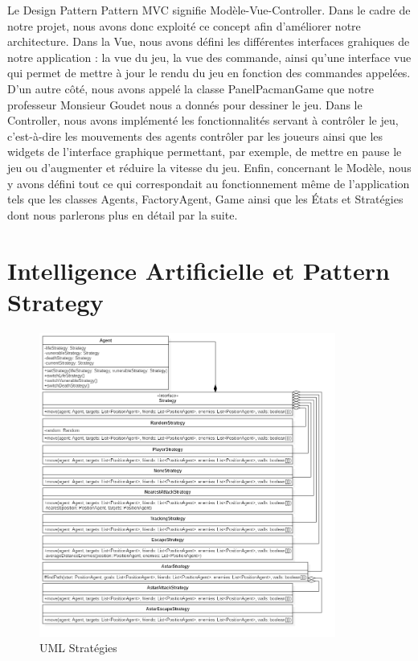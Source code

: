 \documentclass[a4paper, 11pt]{article}
\begin{document}
Le Design Pattern Pattern MVC signifie Modèle-Vue-Controller. Dans le cadre de notre projet, nous avons donc exploité ce concept afin d'améliorer
notre architecture. Dans la Vue, nous avons défini les différentes interfaces grahiques de notre application : la vue du jeu, la vue des commande,
ainsi qu'une interface vue qui permet de mettre à jour le rendu du jeu en fonction des commandes appelées. D'un autre côté, nous avons appelé la
classe PanelPacmanGame que notre professeur Monsieur Goudet nous a donnés pour dessiner le jeu. Dans le Controller, nous avons implémenté les 
fonctionnalités servant à contrôler le jeu, c'est-à-dire les mouvements des agents contrôler par les joueurs ainsi que les widgets de l'interface
graphique permettant, par exemple, de mettre en pause le jeu ou d'augmenter et réduire la vitesse du jeu. Enfin, concernant le Modèle, nous y avons
défini tout ce qui correspondait au fonctionnement même de l'application tels que les classes Agents, FactoryAgent, Game ainsi que les États et Stratégies 
dont nous parlerons plus en détail par la suite. 

\part{Intelligence Artificielle et Pattern Strategy}

\begin{figure}[H]
  \begin{center}
  \includegraphics[height=10cm]{img/png/strategy}
  \end{center}
  \caption[schema]{UML Stratégies}
\end{figure}
\end{document}
